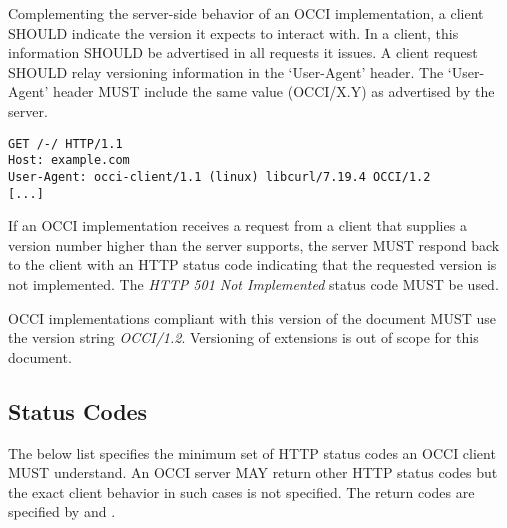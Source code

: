 \documentclass[10pt,a4paper]{article}
\begin{document}
Complementing the server-side behavior of an OCCI implementation, a
client SHOULD indicate the version it expects to interact with. In a
client, this information SHOULD be advertised in all requests it issues.
A client request SHOULD relay versioning information in the `User-Agent'
header. The `User-Agent' header MUST include the same value (OCCI/X.Y)
as advertised by the server.

\begin{verbatim}
GET /-/ HTTP/1.1
Host: example.com
User-Agent: occi-client/1.1 (linux) libcurl/7.19.4 OCCI/1.2
[...]
\end{verbatim}

If an OCCI implementation receives a request from a client that
supplies a version number higher than the server supports, the
server MUST respond back to the client with an HTTP status code indicating
that the requested version is not implemented. The \emph{HTTP 501 Not
Implemented} status code MUST be used.

OCCI implementations compliant with this version of the document MUST
use the version string \emph{OCCI/1.2}. Versioning of extensions is
out of scope for this document.

\subsection{Status Codes}
The below list specifies the minimum set of HTTP status codes an OCCI client MUST
understand. An OCCI server MAY return other HTTP status codes but the exact client
behavior in such cases is not specified. The return codes are specified by
\cite{rfc7231} and \cite{rfc7235}.
\end{document}

